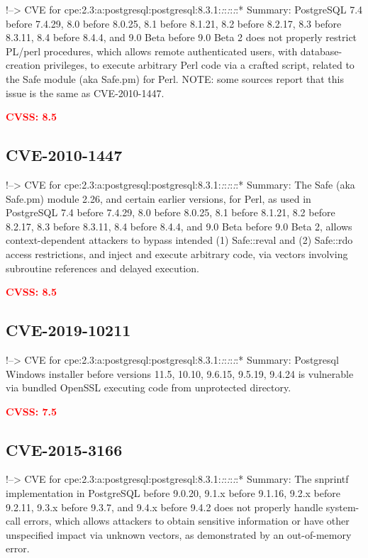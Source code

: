 \documentclass[a4paper, 12pt]{article}
\begin{document}
!--\textgreater{} CVE for
cpe:2.3:a:postgresql:postgresql:8.3.1:\emph{:}:\emph{:}:\emph{:}:*
Summary: PostgreSQL 7.4 before 7.4.29, 8.0 before 8.0.25, 8.1 before
8.1.21, 8.2 before 8.2.17, 8.3 before 8.3.11, 8.4 before 8.4.4, and 9.0
Beta before 9.0 Beta 2 does not properly restrict PL/perl procedures,
which allows remote authenticated users, with database-creation
privileges, to execute arbitrary Perl code via a crafted script, related
to the Safe module (aka Safe.pm) for Perl. NOTE: some sources report
that this issue is the same as CVE-2010-1447.

\textbf{\textcolor{red}{CVSS: 8.5}}

\hypertarget{cve-2010-1447}{%
\subsection{CVE-2010-1447}\label{cve-2010-1447}}

!--\textgreater{} CVE for
cpe:2.3:a:postgresql:postgresql:8.3.1:\emph{:}:\emph{:}:\emph{:}:*
Summary: The Safe (aka Safe.pm) module 2.26, and certain earlier
versions, for Perl, as used in PostgreSQL 7.4 before 7.4.29, 8.0 before
8.0.25, 8.1 before 8.1.21, 8.2 before 8.2.17, 8.3 before 8.3.11, 8.4
before 8.4.4, and 9.0 Beta before 9.0 Beta 2, allows context-dependent
attackers to bypass intended (1) Safe::reval and (2) Safe::rdo access
restrictions, and inject and execute arbitrary code, via vectors
involving subroutine references and delayed execution.

\textbf{\textcolor{red}{CVSS: 8.5}}

\hypertarget{cve-2019-10211}{%
\subsection{CVE-2019-10211}\label{cve-2019-10211}}

!--\textgreater{} CVE for
cpe:2.3:a:postgresql:postgresql:8.3.1:\emph{:}:\emph{:}:\emph{:}:*
Summary: Postgresql Windows installer before versions 11.5, 10.10,
9.6.15, 9.5.19, 9.4.24 is vulnerable via bundled OpenSSL executing code
from unprotected directory.

\textbf{\textcolor{red}{CVSS: 7.5}}

\hypertarget{cve-2015-3166}{%
\subsection{CVE-2015-3166}\label{cve-2015-3166}}

!--\textgreater{} CVE for
cpe:2.3:a:postgresql:postgresql:8.3.1:\emph{:}:\emph{:}:\emph{:}:*
Summary: The snprintf implementation in PostgreSQL before 9.0.20, 9.1.x
before 9.1.16, 9.2.x before 9.2.11, 9.3.x before 9.3.7, and 9.4.x before
9.4.2 does not properly handle system-call errors, which allows
attackers to obtain sensitive information or have other unspecified
impact via unknown vectors, as demonstrated by an out-of-memory error.
\end{document}
